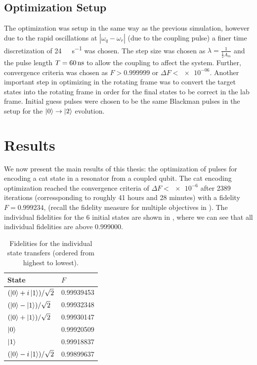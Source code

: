 \documentclass[main.tex]{subfiles}
\begin{document}
\subsection{Optimization Setup}
The optimization was setup in the same way as the previous simulation, however due to the rapid oscillations at \(|\omega_q-\omega_r|\) (due to the coupling pulse) a finer time discretization of \SI{24}{\giga\samples\per\second} was chosen.
The step size was chosen as \(\lambda = \frac{1}{\frac{1}{2}A_{m}}\) and the pulse length \(T = \SI{60}{\nano\second}\) to allow the coupling to affect the system.
Further, convergence criteria was chosen as \(F>0.999999\) or \(\Delta F < \num{e-06}\).
Another important step in optimizing in the rotating frame was to convert the target states into the rotating frame in order for the final states to be correct in the lab frame.
Initial guess pulses were chosen to be the same Blackman pulses in the setup for the \(\ket{0}\rightarrow\ket{2}\) evolution.

\section{Results}
We now present the main results of this thesis: the optimization of pulses for encoding a cat state in a resonator from a coupled qubit.
The cat encoding optimization reached the convergence criteria of \(\Delta F < \num{e-6}\) after 2389 iterations (corressponding to roughly 41 hours and 28 minutes) with a fidelity \(F = 0.999234\), (recall the fidelity measure for multiple objectives in ).
The individual fidelities for the 6 initial states are shown in , where we can see that all individual fidelities are above 0.999000.

\begin{table}[ht]
    \caption{Fidelities for the individual state transfers (ordered from highest to lowest).}%
    \label{tab:cat-fidelities}
    \centering
    \begin{tabular}{@{}ll@{}}
    \toprule
    State & \(F\)\\ \midrule
	\((\ket{0}+i\ket{1})/\sqrt{2}\) & 0.99939453 \\
	\((\ket{0}-\ket{1})/\sqrt{2}\) & 0.99932348 \\
	\((\ket{0}+\ket{1})/\sqrt{2}\) & 0.99930147 \\
    \(\ket{0}\) & 0.99920509 \\
	\(\ket{1}\) & 0.99918837 \\
	\((\ket{0}-i\ket{1})/\sqrt{2}\) & 0.99899637 \\
    \bottomrule
    \end{tabular}
\end{table}
\end{document}
